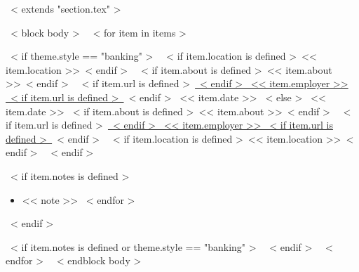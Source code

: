 ~< extends "section.tex" >~

~< block body >~
  ~< for item in items >~
    \begin{samepage}
      \cventry
        ~< if theme.style == "banking" >~
          {~< if item.location is defined >~<< item.location >>~< endif >~}
          {~< if item.about is defined >~<< item.about >>~< endif >~}
          {~< if item.url is defined >~\href{<< item.url >>}{~< endif >~%
             << item.employer >>%
           ~< if item.url is defined >~}~< endif >~}
          {<< item.date >>}
        ~< else >~
          {<< item.date >>}
          {~< if item.about is defined >~<< item.about >>~< endif >~}
          {~< if item.url is defined >~\href{<< item.url >>}{~< endif >~%
             << item.employer >>%
           ~< if item.url is defined >~}~< endif >~}
          {~< if item.location is defined >~<< item.location >>~< endif >~}
        ~< endif >~
        {}
        {
          ~< if item.notes is defined >~
            \begin{itemize}
              ~< for note in item.notes >~
                \item{<< note >>}
              ~< endfor >~
            \end{itemize}
          ~< endif >~
        }
    \end{samepage}
    ~< if item.notes is defined or theme.style == "banking" >~
      \vspace{10pt}
    ~< endif >~
  ~< endfor >~
  \vspace{-10pt}
~< endblock body >~